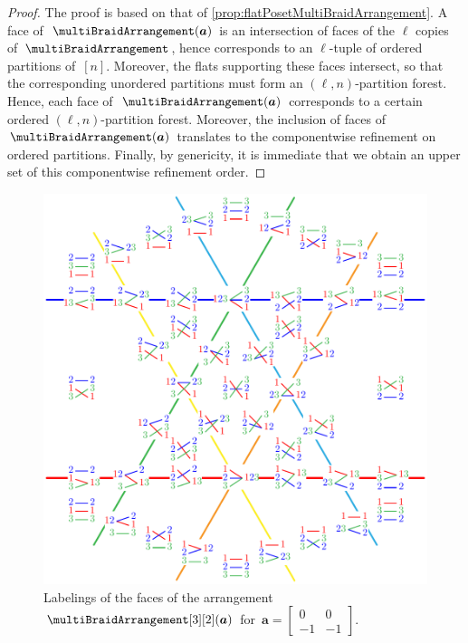 \documentclass{amsart}
\theoremstyle{definition}
\renewcommand{\b}[1]{{\boldsymbol{#1}}} %
\renewcommand{\b}[1]{\boldsymbol{#1}} %
\begin{document}
\begin{proof}
The proof is based on that of \cref{prop:flatPosetMultiBraidArrangement}.
A face of~$\multiBraidArrangement(\b{a})$ is an intersection of faces of the $\ell$ copies of~$\multiBraidArrangement$, hence corresponds to an $\ell$-tuple of ordered partitions of~$[n]$.
Moreover, the flats supporting these faces intersect, so that the corresponding unordered partitions must form an $(\ell,n)$-partition forest.
Hence, each face of~$\multiBraidArrangement(\b{a})$ corresponds to a certain ordered $(\ell,n)$-partition forest.
Moreover, the inclusion of faces of~$\multiBraidArrangement(\b{a})$ translates to the componentwise refinement on ordered partitions.
Finally, by genericity, it is immediate that we obtain an upper set of this componentwise refinement order.
\end{proof}

\begin{figure}
	\includegraphics[scale=.9]{B23a}
	\caption{Labelings of the faces of the arrangement~$\multiBraidArrangement[3][2](\b{a})$ for~$\b{a} = \begin{bmatrix} 0 & 0 \\ -1 & -1 \end{bmatrix}$.}
	\label{fig:B23a}
\end{figure}
\end{document}
